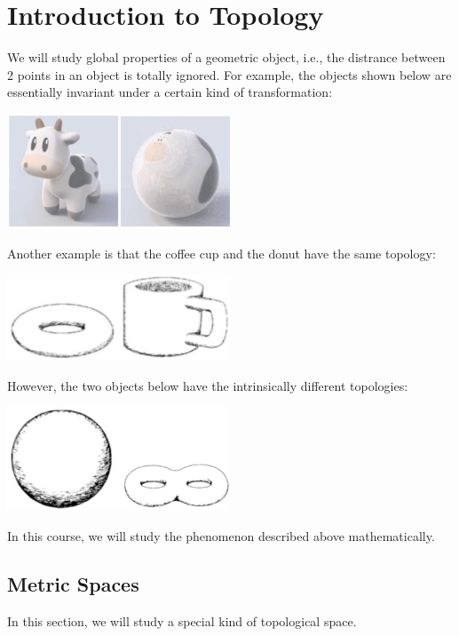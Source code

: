 \chapter{Introduction to Topology}

We will study global properties of a geometric object, i.e., the distrance between 2 points in an object is totally ignored. For example, the objects shown below are essentially invariant under a certain kind of transformation:

\begin{center}
\includegraphics[width=0.5\textwidth]{images/ch1_cow.jpg}
\end{center}
\hspace*{3em} 

Another example is that the coffee cup and the donut have the same topology:

\begin{center}
\includegraphics[width=0.5\textwidth]{images/ch1_donutmug.jpg}
\end{center}

However, the two objects below have the intrinsically different topologies:

\begin{center}
\includegraphics[width=0.5\textwidth]{images/ch1_twoholes.jpg}
\end{center}

In this course, we will study the phenomenon described above mathematically.

\section{Metric Spaces}
In this section, we will study a special kind of topological space.

